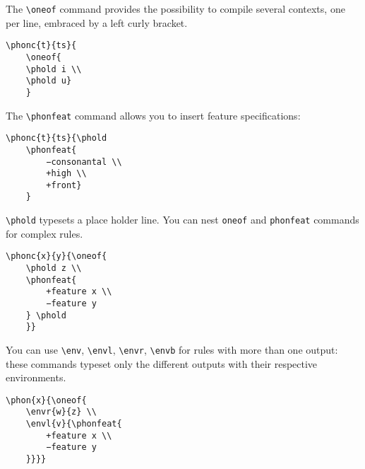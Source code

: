 \documentclass[a4paper]{article}
\begin{document}
The \verb+\oneof+ command provides the possibility to compile several contexts, one per line, embraced by a left curly bracket.

\begin{exe}
\ex
\begin{verbatim}
\phonc{t}{ts}{
	\oneof{
	\phold i \\
	\phold u}
	}
\end{verbatim}
\ex {}
\end{exe}

The \verb+\phonfeat+ command allows you to insert feature specifications:

\begin{exe}
\ex
\begin{verbatim}
\phonc{t}{ts}{\phold 
	\phonfeat{
		−consonantal \\
		+high \\
		+front}
	}
\end{verbatim}
\ex {}
\end{exe}

\verb+\phold+ typesets a place holder line. You can nest \verb|oneof| and \verb|phonfeat| commands for complex rules.

\begin{exe}
\ex
\begin{verbatim}
\phonc{x}{y}{\oneof{
	\phold z \\
	\phonfeat{
		+feature x \\
		−feature y
	} \phold
	}}
\end{verbatim}
\ex {}
\end{exe}

You can use \verb|\env|, \verb|\envl|, \verb|\envr|, \verb|\envb| for rules with more than one output: these commands typeset only the different outputs with their respective environments.

\begin{exe}
\ex
\begin{verbatim}
\phon{x}{\oneof{
	\envr{w}{z} \\
	\envl{v}{\phonfeat{
		+feature x \\
		−feature y
	}}}}
\end{verbatim}
\ex {}
\end{exe}
\end{document}

